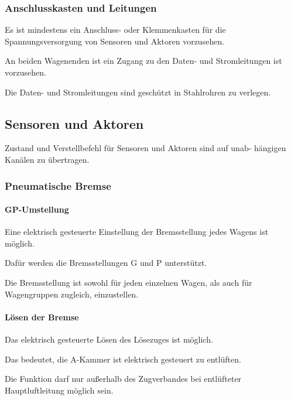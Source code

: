 \subsubsection{Anschlusskasten und Leitungen}
\begin{feat}
Es ist mindestens ein Anschluss- oder Klemmenkasten für die Spannungsversorgung von Sensoren und Aktoren vorzusehen. 
\end{feat}
\begin{feat}
An beiden Wagenenden ist ein Zugang zu den Daten- und Stromleitungen ist vorzusehen.
\end{feat}
\begin{feat}
Die Daten- und Stromleitungen sind geschützt in Stahlrohren zu verlegen.
\end{feat}

\subsection{Sensoren und Aktoren}
\begin{feat}
Zustand und Verstellbefehl für Sensoren und Aktoren sind auf unab- hängigen Kanälen zu übertragen.
\end{feat}
\subsubsection{Pneumatische Bremse}
\paragraph{GP-Umstellung}
\begin{feat}
Eine elektrisch gesteuerte Einstellung der Bremsstellung jedes Wagens ist möglich.
\end{feat}
\begin{rem} [zu Anf. 17]
Dafür werden die Bremsstellungen G und P unterstützt.
\end{rem}
\begin{rem} [zu Anf. 17]
Die Bremsstellung ist sowohl für jeden einzelnen Wagen, als auch für Wagengruppen zugleich, einzustellen.
\end{rem}

\paragraph{Lösen der Bremse}
\begin{feat}
Das elektrisch gesteuerte Lösen des Lösezuges ist möglich.
\end{feat}
\begin{rem}[zu Anf. 18]
Das bedeutet, die A-Kammer ist elektrisch gesteuert zu entlüften.
\end{rem}
\begin{rem}[zu Anf. 18]
Die Funktion darf nur außerhalb des \gls{Zugverband}es bei entlüfteter Hauptluftleitung möglich sein.
\end{rem}

